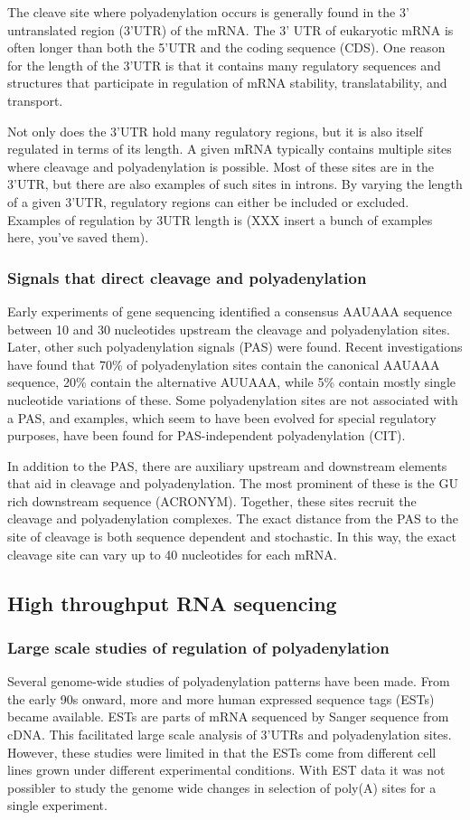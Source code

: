 The cleave site where polyadenylation occurs is generally found in the 3'
untranslated region (3'UTR) of the mRNA. The 3' UTR of eukaryotic mRNA is often
longer than both the 5'UTR and the coding sequence (CDS). One reason for the
length of the 3'UTR is that it contains many regulatory sequences and
structures that participate in regulation of mRNA stability, translatability,
and transport.

Not only does the 3'UTR hold many regulatory regions, but it is also itself
regulated in terms of its length. A given mRNA typically contains multiple
sites where cleavage and polyadenylation is possible. Most of these sites are
in the 3'UTR, but there are also examples of such sites in introns. By varying
the length of a given 3'UTR, regulatory regions can either be included or
excluded. Examples of regulation by 3UTR length is (XXX insert a bunch of
examples here, you've saved them).

\subsubsection{Signals that direct cleavage and polyadenylation}
Early experiments of gene sequencing identified a consensus AAUAAA sequence
between 10 and 30 nucleotides upstream the cleavage and polyadenylation sites.
Later, other such polyadenylation signals (PAS) were found. Recent
investigations have found that 70\% of polyadenylation sites contain the
canonical AAUAAA sequence, 20\% contain the alternative AUUAAA, while 5\%
contain mostly single nucleotide variations of these. Some polyadenylation
sites are not associated with a PAS, and examples, which seem to have been
evolved for special regulatory purposes, have been found for PAS-independent
polyadenylation (CIT).

In addition to the PAS, there are auxiliary upstream and downstream elements
that aid in cleavage and polyadenylation. The most prominent of these is the GU
rich downstream sequence (ACRONYM). Together, these sites recruit the cleavage
and polyadenylation complexes. The exact distance from the PAS to the site of
cleavage is both sequence dependent and stochastic. In this way, the exact
cleavage site can vary up to 40 nucleotides for each mRNA.

\subsection{High throughput RNA sequencing}
\subsubsection{Large scale studies of regulation of polyadenylation}
Several genome-wide studies of polyadenylation patterns have been made. From
the early 90s onward, more and more human expressed sequence tags (ESTs) became
available. ESTs are parts of mRNA sequenced by Sanger sequence from cDNA. This
facilitated large scale analysis of 3'UTRs and polyadenylation sites. However,
these studies were limited in that the ESTs come from different cell lines
grown under different experimental conditions. With EST data it was not
possibler to study the genome wide changes in selection of poly(A) sites for a
single experiment.

